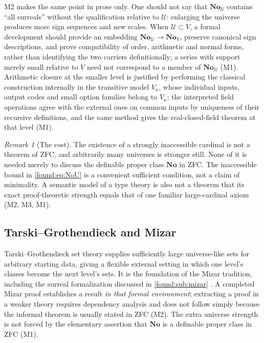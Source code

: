 \documentclass[11pt,letterpaper]{article}
\numberwithin{equation}{section}
\theoremstyle{definition}
\theoremstyle{remark}
\newtheorem{remark}[theorem]{Remark}
\newcommand{\No}{\mathbf{No}}
\newcommand{\U}{\mathcal U}
\begin{document}
M2 makes the same point in prose only. One should not say that $\No_\U$ contains
``all surreals'' without the qualification relative to $\U$: enlarging the
universe produces more sign sequences and new scales. When $\U\subset V$, a
formal development should provide an embedding $\No_\U\to\No_V$, preserve
canonical sign descriptions, and prove compatibility of order, arithmetic and
normal forms, rather than identifying the two carriers definitionally; a series
with support merely small relative to $V$ need not correspond to a member of
$\No_\U$ (M1). Arithmetic closure at the smaller level is justified by
performing the classical construction internally in the transitive model
$V_\kappa$, whose individual inputs, output codes and small option families
belong to $V_\kappa$; the interpreted field operations agree with the external
ones on common inputs by uniqueness of their recursive definitions, and the
same method gives the real-closed-field theorem at that level (M1).

\begin{remark}[The cost]\label{found:rem:universecost}
The existence of a strongly inaccessible cardinal is not a theorem of ZFC, and
arbitrarily many universes is stronger still. None of it is needed merely to
discuss the definable proper class $\No$ in ZFC. The inaccessible bound in
\eqref{found:eq:NoU} is a convenient sufficient condition, not a claim of
minimality. A semantic model of a type theory is also not a theorem that its
exact proof-theoretic strength equals that of one familiar large-cardinal
axiom (M2, M3, M1).
\end{remark}

\subsection{Tarski--Grothendieck and Mizar}
\label{found:sub:tg}
Tarski--Grothendieck set theory supplies sufficiently large universe-like sets
for arbitrary starting data, giving a flexible external setting in which one
level's classes become the next level's sets. It is the foundation of the Mizar
tradition, including the surreal formalization discussed in
\cref{found:sub:mizar} \cite{found:PakKaliszyk}. A completed Mizar proof
establishes a result \emph{in that formal environment}; extracting a proof in a
weaker theory requires dependency analysis and does not follow simply because
the informal theorem is usually stated in ZFC (M2). The extra universe strength
is not forced by the elementary assertion that $\No$ is a definable proper class
in ZFC (M1).
\end{document}
